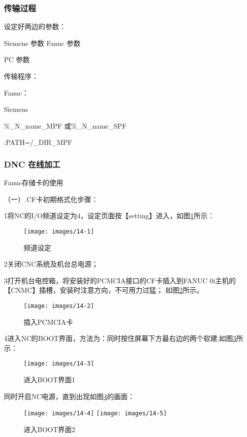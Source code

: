 \subsubsection{传输过程}
设定好两边的参数：

Siemens 参数      Fanuc 参数

PC 参数

传输程序：

Fanuc：

Siemens

\%\_N\_name\_MPF    或\%\_N\_name\_SPF

;PATH=/\_DIR\_MPF

\subsubsection{DNC 在线加工}

Fanuc存储卡的使用

（一）.CF卡初期格式化步骤：

1将NC的I/O频道设定为4，设定页面按【setting】进入，如图\ref{频道设定}所示：

\begin{figure}[!hbtp]
	\centering	\texttt{[image: images/14-1]}
	\caption{频道设定} \label{频道设定}
\end{figure}

2关闭CNC系统及机台总电源；

3打开机台电控箱，将安装好的PCMCIA接口的CF卡插入到FANUC 0i主机的【CNMC】插槽，安装时注意方向，不可用力过猛；
如图\ref{插入PCMCIA卡}所示。

\begin{figure}[!hbtp]
	\centering	\texttt{[image: images/14-2]}
	\caption{插入PCMCIA卡} \label{插入PCMCIA卡}
\end{figure}

4进入NC的BOOT界面，方法为：同时按住屏幕下方最右边的两个软建,如图\ref{进入BOOT界面}所示：

\begin{figure}[!hbtp]
\centering	\texttt{[image: images/14-3]}
\caption{进入BOOT界面1} \label{进入BOOT界面}
\end{figure}

同时开启NC电源，直到出现如图\ref{进入BOOT界面1}的画面：

\begin{figure}[!hbtp]
\centering	\texttt{[image: images/14-4]}
\centering	\texttt{[image: images/14-5]}
\caption{进入BOOT界面2} \label{进入BOOT界面1}
\end{figure}

